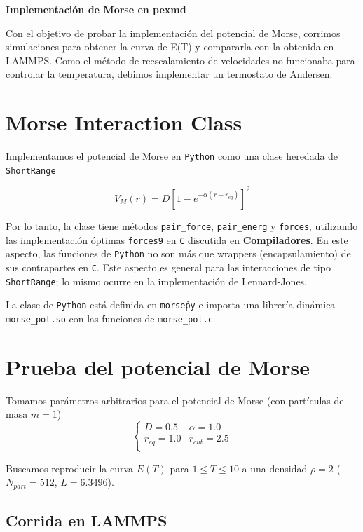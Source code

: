 \documentclass[twoside, 12pt]{article}
\begin{document}
	
\begin{center}
	{\fontsize{20pt}{10pt}\textbf{Implementación de Morse en pexmd}}
\end{center}

Con el objetivo de probar la implementación del potencial de Morse, corrimos simulaciones para obtener la curva de E(T) y compararla con la obtenida en LAMMPS. 
Como el método de reescalamiento de velocidades no funcionaba para controlar la temperatura, debimos implementar un termostato de Andersen. 

\section{Morse Interaction Class}

Implementamos el potencial de Morse en \texttt{Python} como una clase heredada de \texttt{ShortRange}

\[ V_{M} (r) = D\left[1-e^{-\alpha (r-r_{eq})}\right]^2\]

Por lo tanto, la clase tiene métodos \texttt{pair\_force}, \texttt{pair\_energ} y \texttt{forces}, utilizando las implementación óptimas \texttt{forces9} en \texttt{C} discutida en \textbf{Compiladores}. 
En este aspecto, las funciones de \texttt{Python} no son más que wrappers (encapsulamiento) de sus contrapartes en \texttt{C}. Este aspecto es general para las interacciones de tipo \texttt{ShortRange}; 
lo mismo ocurre en la implementación de Lennard-Jones. 

La clase de \texttt{Python} está definida en \texttt{morse\.py} e importa una librería dinámica \texttt{morse\_pot.so} con las funciones de \texttt{morse\_pot.c}

\section{Prueba del potencial de Morse}

Tomamos parámetros arbitrarios para el potencial de Morse (con partículas de masa $m=1$)
\[ \left\{\begin{matrix}
D = 0.5 & \alpha = 1.0 \\
r_{eq} = 1.0 & r_{cut} = 2.5\\
\end{matrix} \right. \]

Buscamos reproducir la curva $E(T)$ para $1\leq T\leq 10$ a una densidad $\rho = 2$ ($N_{part}=512$, $L=6.3496$).

\subsection{Corrida en LAMMPS}
\end{document}
